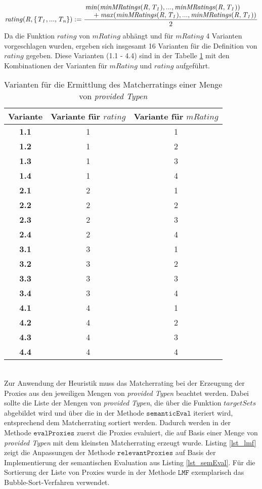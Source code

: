 \begin{gather*}
\mathit{rating(R,\{T_1,...,T_n\})} := 
	\frac{\splitfrac{\mathit{min(minMRatings(R,T_1),...,minMRatings(R,T_1))}}
	{+ \mathit{max(minMRatings(R,T_1),...,minMRatings(R,T_1))}}}{2}	
\end{gather*}
\noindent
Da die Funktion $\mathit{rating}$ von $\mathit{mRating}$ abhängt und für $\mathit{mRating}$ 4 Varianten vorgeschlagen wurden, ergeben sich insgesamt 16 Varianten für die Definition von $\mathit{rating}$ gegeben. Diese Varianten (1.1 - 4.4) sind in der Tabelle \ref{tab_matcherratingvarianten} mit den Kombinationen der Varianten für $\mathit{mRating}$ und $\mathit{rating}$ aufgeführt.
\begin{table}[h!]
\centering
\small
\begin{tabular}{|c|c|c|}
\hline
\hline
\textbf{Variante} & Variante für $\mathit{rating}$ & Variante für $\mathit{mRating}$
\\
\hline
\hline
\textbf{1.1} & 1 & 1 \\
\hline
\textbf{1.2} & 1 & 2 \\
\hline
\textbf{1.3} & 1 & 3 \\
\hline
\textbf{1.4} & 1 & 4 \\
\hline
\textbf{2.1} & 2 & 1 \\
\hline
\textbf{2.2} & 2 & 2 \\
\hline
\textbf{2.3} & 2 & 3 \\
\hline
\textbf{2.4} & 2 & 4 \\
\hline
\textbf{3.1} & 3 & 1 \\
\hline
\textbf{3.2} & 3 &2 \\
\hline
\textbf{3.3} & 3 & 3 \\
\hline
\textbf{3.4} & 3 & 4 \\
\hline
\textbf{4.1} & 4 & 1 \\
\hline
\textbf{4.2} & 4 & 2 \\
\hline
\textbf{4.3} & 4 & 3 \\
\hline
\textbf{4.4} & 4 & 4 \\
\hline
\hline
\end{tabular}
\caption{Varianten für die Ermittlung des Matcherratings einer Menge von \emph{provided Typen}}
 \label{tab_matcherratingvarianten}
\end{table}
\noindent
\\
Zur Anwendung der Heuristik muss das Matcherrating bei der Erzeugung der Proxies aus den jeweiligen Mengen von \emph{provided Typen} beachtet werden. Dabei sollte die Liste der Mengen von \emph{provided Typen}, die über die Funktion $\mathit{targetSets}$ abgebildet wird und über die in der Methode $\texttt{semanticEval}$ iteriert wird, entsprechend dem Matcherrating sortiert werden. Dadurch werden in der Methode $\texttt{evalProxies}$ zuerst die Proxies evaluiert, die auf Basis einer Menge von \emph{provided Typen} mit dem kleinsten Matcherrating erzeugt wurde. Listing \ref{lst_lmf} zeigt die Anpassungen der Methode $\texttt{relevantProxies}$ auf Basis der Implementierung der semantischen Evaluation aus Listing \ref{lst_semEval}. Für die Sortierung der Liste von Proxies wurde in der Methode $\texttt{LMF}$ exemplarisch das Bubble-Sort-Verfahren verwendet.
